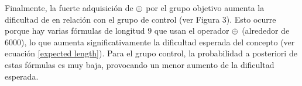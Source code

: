 Finalmente, la fuerte adquisición de $ \oplus $ por el grupo objetivo aumenta la dificultad de \testb en relación con el grupo de control (ver Figura 3). Esto ocurre porque hay varias fórmulas de longitud $9$ que usan el operador $ \oplus $ (alrededor de $6000$), lo que aumenta significativamente la dificultad esperada del concepto (ver ecuación \eqref{expected length}). Para el grupo control, la probabilidad a posteriori  de estas fórmulas es muy baja, provocando un menor aumento de la dificultad esperada.

